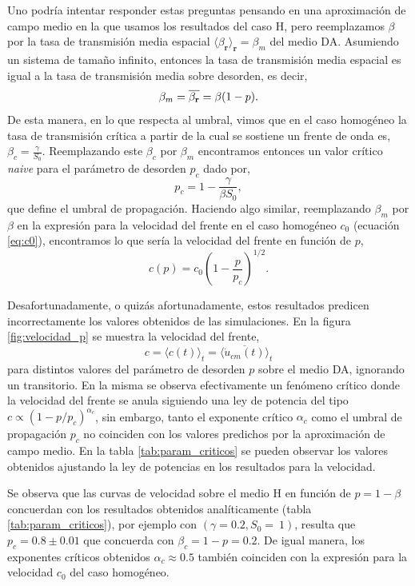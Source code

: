 Uno podría intentar responder estas preguntas pensando en una aproximación de campo medio en la que usamos los resultados del caso H, pero reemplazamos $\beta$ por la tasa de transmisión media espacial $\langle\beta_{\textbf{r}}\rangle_{\textbf{r}} = \beta_m$ del medio DA. Asumiendo un sistema de tamaño infinito, entonces la tasa de transmisión media espacial es igual a la tasa de transmisión media sobre desorden, es decir,
\begin{equation}
    \beta_m = \overline{\beta_{\vb r}} = \beta(1-p).
\end{equation}
De esta manera, en lo que respecta al umbral, vimos que en el caso homogéneo la tasa de transmisión crítica a partir de la cual se sostiene un frente de onda es, $\beta_c=\frac{\gamma}{S_0}$. Reemplazando este $\beta_c$ por $\beta_m$ encontramos entonces un valor crítico \textit{naive} para el parámetro de desorden $p_c$ dado por,
\begin{equation}
    p_c = 1 - \frac{\gamma}{\beta S_0},
\end{equation}
que define el umbral de propagación. Haciendo algo similar, reemplazando $\beta_m$ por $\beta$ en la expresión para la velocidad del frente en el caso homogéneo $c_0$ (ecuación \ref{eq:c0}), encontramos lo que sería la velocidad del frente en función de $p$,
\begin{equation}
    c(p) = c_0\left(1-\frac{p}{p_c}\right)^{1/2}.
\end{equation}

Desafortunadamente, o quizás afortunadamente, estos resultados predicen incorrectamente los valores obtenidos de las simulaciones. En la figura \ref{fig:velocidad_p} se muestra la velocidad del frente,
\begin{equation}
    c = \langle c(t)\rangle_t = \langle \overline{\dot{u}_{cm}(t)}\rangle_t
\end{equation}
para distintos valores del parámetro de desorden $p$ sobre el medio DA, ignorando un transitorio. En la misma se observa efectivamente un fenómeno crítico donde la velocidad del frente se anula siguiendo una ley de potencia del tipo $c \propto (1-p/p_c)^{\alpha_c}$, sin embargo, tanto el exponente crítico $\alpha_c$ como el umbral de propagación $p_c$ no coinciden con los valores predichos por la aproximación de campo medio. En la tabla \ref{tab:param_criticos} se pueden observar los valores obtenidos ajustando la ley de potencias en los resultados para la velocidad.

Se observa que las curvas de velocidad sobre el medio H en función de $p =1 - \beta$ concuerdan con los resultados obtenidos analíticamente (tabla \ref{tab:param_criticos}), por ejemplo con $(\gamma=0.2,S_0=~1)$, resulta que $p_c = 0.8\pm 0.01$ que concuerda con $\beta_c = 1- p =  0.2$. De igual manera, los exponentes críticos obtenidos $\alpha_c\approx 0.5$ también coinciden con la expresión para la velocidad $c_0$ del caso homogéneo.



